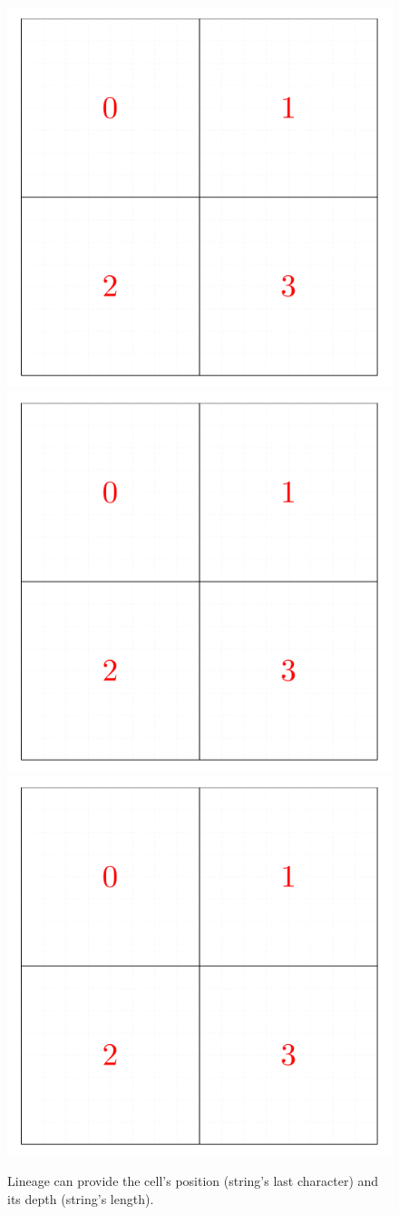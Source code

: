 \begin{figure}
    \includegraphics[page=1,width=0.32\linewidth]{figures/cellinpolygon/lineage}
    \includegraphics[page=2,width=0.32\linewidth]{figures/cellinpolygon/lineage}
    \includegraphics[page=3,width=0.32\linewidth]{figures/cellinpolygon/lineage}
    \caption{Lineage can provide the cell's position (string's last character) and its depth (string's length).}
    \label{fig:lineage_example}
\end{figure}

